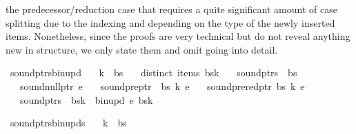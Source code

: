 \begin{isabellebody}
\begin{isamarkuptext}
the predecessor/reduction case that requires a quite significant amount of case splitting due to the indexing and depending
on the type of the newly inserted items. Nonetheless, since the proofs are very technical but do not
reveal anything new in structure, we only state them and omit going into detail.%
\end{isamarkuptext}\isamarkuptrue%
\isamarkupfalse%
\ sound{\isacharunderscore}{\kern0pt}ptrs{\isacharunderscore}{\kern0pt}bin{\isacharunderscore}{\kern0pt}upd{\isacharcolon}{\kern0pt}\isanewline
\ \ \ {\isachardoublequoteopen}k\ {\isacharless}{\kern0pt}\ {\isacharbar}{\kern0pt}bs{\isacharbar}{\kern0pt}{\isachardoublequoteclose}\isanewline
\ \ \ {\isachardoublequoteopen}distinct\ {\isacharparenleft}{\kern0pt}items\ {\isacharparenleft}{\kern0pt}bs{\isacharbang}{\kern0pt}k{\isacharparenright}{\kern0pt}{\isacharparenright}{\kern0pt}{\isachardoublequoteclose}\isanewline
\ \ \ {\isachardoublequoteopen}sound{\isacharunderscore}{\kern0pt}ptrs\ {\isasymomega}\ bs{\isachardoublequoteclose}\isanewline
\ \ \ {\isachardoublequoteopen}sound{\isacharunderscore}{\kern0pt}null{\isacharunderscore}{\kern0pt}ptr\ e{\isachardoublequoteclose}\isanewline
\ \ \ {\isachardoublequoteopen}sound{\isacharunderscore}{\kern0pt}pre{\isacharunderscore}{\kern0pt}ptr\ {\isasymomega}\ bs\ k\ e{\isachardoublequoteclose}\isanewline
\ \ \ {\isachardoublequoteopen}sound{\isacharunderscore}{\kern0pt}prered{\isacharunderscore}{\kern0pt}ptr\ bs\ k\ e{\isachardoublequoteclose}\isanewline
\ \ \ {\isachardoublequoteopen}sound{\isacharunderscore}{\kern0pt}ptrs\ {\isasymomega}\ {\isacharparenleft}{\kern0pt}bs{\isacharbrackleft}{\kern0pt}k\ {\isacharcolon}{\kern0pt}{\isacharequal}{\kern0pt}\ bin{\isacharunderscore}{\kern0pt}upd\ e\ {\isacharparenleft}{\kern0pt}bs{\isacharbang}{\kern0pt}k{\isacharparenright}{\kern0pt}{\isacharbrackright}{\kern0pt}{\isacharparenright}{\kern0pt}{\isachardoublequoteclose}%
\isadelimproof
%
\endisadelimproof
%
\isatagproof
%
\endisatagproof
{\isafoldproof}%
%
\isadelimproof
%
\endisadelimproof
%
\begin{isamarkuptext}%
%
\end{isamarkuptext}\isamarkuptrue%
\isamarkupfalse%
\ sound{\isacharunderscore}{\kern0pt}ptrs{\isacharunderscore}{\kern0pt}bin{\isacharunderscore}{\kern0pt}upds{\isacharcolon}{\kern0pt}\isanewline
\ \ \ {\isachardoublequoteopen}k\ {\isacharless}{\kern0pt}\ {\isacharbar}{\kern0pt}bs{\isacharbar}{\kern0pt}{\isachardoublequoteclose}\isanewline

\end{isabellebody}
